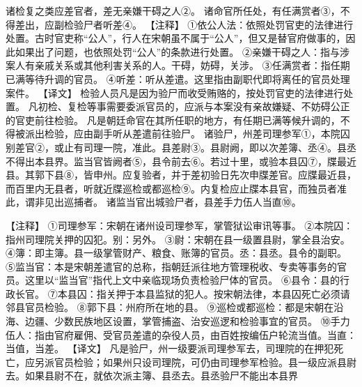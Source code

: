\documentclass[12pt,UTF8]{ctexbook}
\begin{document}
诸检复之类应差官者，差无亲嫌干碍之人②。
诸命官所任处，有任满赏者③，不得差出，应副检验尸者听差④。
【注释】
①依公人法：依照处罚官吏的法律进行处置。古时官吏称“公人”，行人在宋朝虽不属于“公人”，但又是替官府做事的，因此如果出了问题，也依照处罚“公人”的条款进行处置。
②亲嫌干碍之人：指与涉案人有亲戚关系或其他利害关系的人。干碍，妨碍，关涉。
③任满赏者：指任期已满等待升调的官员。
④听差：听从差遣。这里指由副职代即将离任的官员处理案件。
【译文】
检验人员凡是因为验尸而收受贿赂的，按处罚官吏的法律进行处置。
凡初检、复检等事需要委派官员的，应派与本案没有亲故嫌疑、不妨碍公正的官吏前往检验。
凡是朝廷命官在其所任职的地方，有任期已满等候升调的，不得被派出检验，应由副手听从差遣前往验尸。
诸验尸，州差司理参军①，本院囚别差官②，或止有司理一院，准此。县差尉③。县尉阙，即以次差簿、丞④。县丞不得出本县界。监当官皆阙者⑤，县令前去⑥。若过十里，或验本县囚⑦，牒最近县。其郭下县⑧，皆申州。应复验者，并于差初验日先次申牒差官。应牒最近县，而百里内无县者，听就近牒巡检或都巡检⑨。内复检应止牒本县官，而独员者准此，谓非见出巡捕者。
诸监当官出城验尸者，县差手力伍人当直⑩。

【注释】
①司理参军：宋朝在诸州设司理参军，掌管狱讼审讯等事。
②本院囚：指州司理院关押的囚犯。别：另外。
③尉：宋朝在县一级置县尉，掌全县治安。
④簿：即主簿。县一级掌管财产、粮食、账簿的官员。丞：县丞。县令的副职。
⑤监当官：本是宋朝差遣官的总称，指朝廷派往地方管理税收、专卖等事务的官员。这里以“监当官”指代上文中亲临现场负责检验尸体的官员。
⑥县令：县的行政长官。
⑦本县囚：指关押于本县监狱的犯人。按宋朝法律，本县囚死亡必须请邻县官员检验。
⑧郭下县：州府所在地的县。
⑨巡检或都巡检：都是宋朝在沿海、边疆、少数民族地区设置，掌管捕盗、治安巡逻和检验事宜的官员。
⑩手力伍人：指由官府雇佣、受官员差遣的杂役人员，由百姓按编伍户轮流当值。当直：当值，当差。
【译文】
凡是验尸，州一级要派司理参军去，司理院的在押犯死亡，应另派官员检验；如果州只设司理院，可仍由司理参军检验。县一级应派县尉去。如果县尉不在，就依次派主簿、县丞去。县丞验尸不能出本县界
\end{document}
